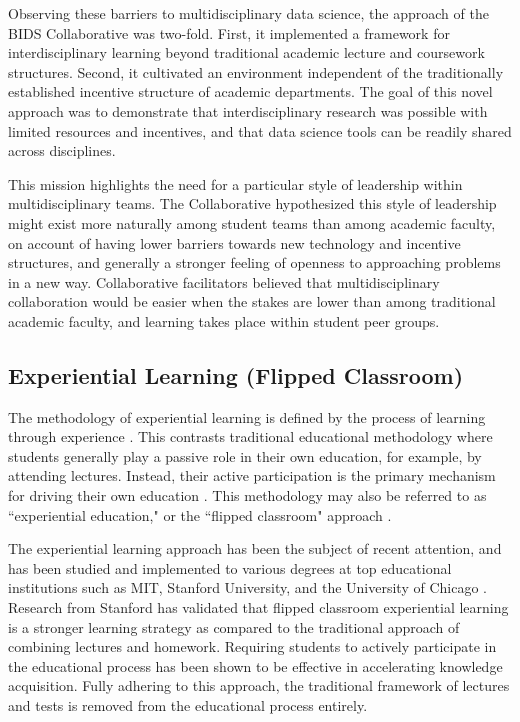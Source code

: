 \documentclass[12pt]{article}
\begin{document}
Observing these barriers to multidisciplinary data science, the approach of the BIDS Collaborative was two-fold. First, it implemented a framework for interdisciplinary learning beyond traditional academic lecture and coursework structures. Second, it cultivated an environment independent of the traditionally established incentive structure of academic departments. The goal of this novel approach was to demonstrate that interdisciplinary research was possible with limited resources and incentives, and that data science tools can be readily shared across disciplines.

This mission highlights the need for a particular style of leadership within multidisciplinary teams.  The Collaborative hypothesized this style of leadership might exist more naturally among student teams than among academic faculty, on account of having lower barriers towards new technology and incentive structures, and generally a stronger feeling of openness to approaching problems in a new way.  Collaborative facilitators believed that multidisciplinary collaboration would be easier when the stakes are lower than among traditional academic faculty, and learning takes place within student peer groups.

\subsection{Experiential Learning (Flipped Classroom)}

The methodology of experiential learning is defined by the process of learning through experience \citep{felicia2011handbook}.  This contrasts traditional educational methodology where students generally play a passive role in their own education, for example, by attending lectures.  Instead, their active participation is the primary mechanism for driving their own education \citep{beard2010experiential}. This methodology may also be referred to as ``experiential education," or the ``flipped classroom" approach \citep[\emph{e.g.,}][]{Horn2013, Herreid2013}.

The experiential learning approach has been the subject of recent attention, and has been studied and implemented to various degrees at top educational institutions such as MIT, Stanford University, and the University of Chicago \citep[\emph{e.g.,}][]{mit_news_flipped_2014}.  Research from Stanford \citep{plotnikoff_classes_2013} has validated that flipped classroom experiential learning is a stronger learning strategy as compared to the traditional approach of combining lectures and homework. Requiring students to actively participate in the educational process has been shown to be effective in accelerating knowledge acquisition. Fully adhering to this approach, the traditional framework of lectures and tests is removed from the educational process entirely. 
\end{document}
